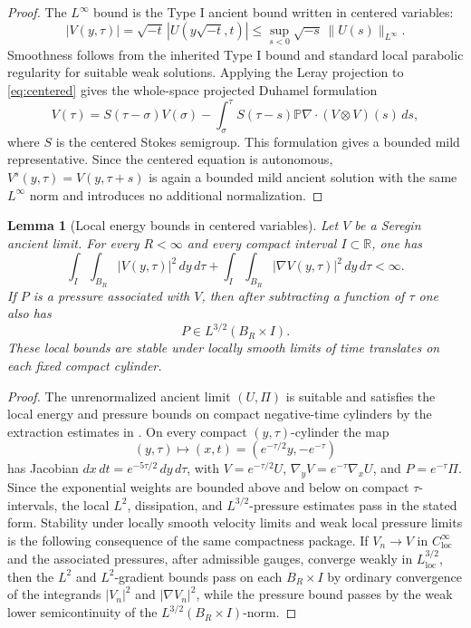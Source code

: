 \documentclass[11pt]{amsart}
\theoremstyle{plain}
\newtheorem{lemma}[theorem]{Lemma}
\theoremstyle{definition}
\theoremstyle{remark}
\numberwithin{equation}{section}
\begin{document}
\begin{proof}
The \(L^\infty\) bound is the Type I ancient bound written in centered
variables:
\[
   |V(y,\tau)|
   =
   \sqrt{-t}\,|U(y\sqrt{-t},t)|
   \le
   \sup_{s<0}\sqrt{-s}\,\|U(s)\|_{L^\infty}.
\]
Smoothness follows from the inherited Type I bound and standard local
parabolic regularity for suitable weak solutions.  Applying the Leray
projection to \eqref{eq:centered} gives the whole-space projected Duhamel
formulation
\[
   V(\tau)=S(\tau-\sigma)V(\sigma)
   -\int_\sigma^\tau
      S(\tau-s)\mathbb P\nabla\cdot(V\otimes V)(s)\,ds,
\]
where \(S\) is the centered Stokes semigroup.  This formulation gives a
bounded mild representative.  Since the centered equation is autonomous,
\(V^s(y,\tau)=V(y,\tau+s)\) is again a bounded mild ancient solution with the
same \(L^\infty\) norm and introduces no additional normalization.
\end{proof}

\begin{lemma}[Local energy bounds in centered variables]\label{lem:finite-energy-local}
Let \(V\) be a Seregin ancient limit.  For every \(R<\infty\) and every compact
interval \(I\subset\mathbb R\), one has
\[
   \int_I\int_{B_R}|V(y,\tau)|^2\,dy\,d\tau
   +
   \int_I\int_{B_R}|\nabla V(y,\tau)|^2\,dy\,d\tau
   <\infty .
\]
If \(P\) is a pressure associated with \(V\), then after subtracting a function
of \(\tau\) one also has
\[
   P\in L^{3/2}(B_R\times I).
\]
These local bounds are stable under locally smooth limits of time translates
on each fixed compact cylinder.
\end{lemma}

\begin{proof}
The unrenormalized ancient limit \((U,\Pi)\) is suitable and satisfies the
local energy and pressure bounds on compact negative-time cylinders by the
extraction estimates in .  On every compact
\((y,\tau)\)-cylinder the map
\[
   (y,\tau)\mapsto (x,t)=(e^{-\tau/2}y,-e^{-\tau})
\]
has Jacobian \(dx\,dt=e^{-5\tau/2}\,dy\,d\tau\), with
\(V=e^{-\tau/2}U\), \(\nabla_yV=e^{-\tau}\nabla_xU\), and
\(P=e^{-\tau}\Pi\).  Since the exponential weights are bounded above and below
on compact \(\tau\)-intervals, the local \(L^2\), dissipation, and
\(L^{3/2}\)-pressure estimates pass in the stated form.  Stability under
locally smooth velocity limits and weak local pressure limits is the following
consequence of the same compactness package.  If
\(V_n\to V\) in \(C^\infty_{\mathrm{loc}}\) and the associated pressures,
after admissible gauges, converge weakly in
\(L^{3/2}_{\mathrm{loc}}\), then the \(L^2\) and \(L^2\)-gradient bounds pass
on each \(B_R\times I\) by ordinary convergence of the integrands
\(|V_n|^2\) and \(|\nabla V_n|^2\), while the pressure bound passes by the weak
lower semicontinuity of the \(L^{3/2}(B_R\times I)\)-norm.
\end{proof}
\end{document}
